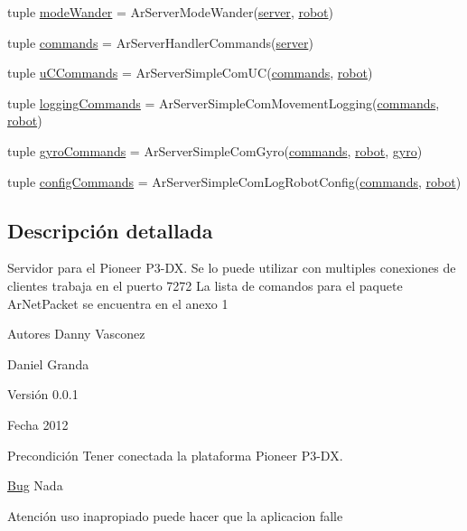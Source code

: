 \begin{DoxyCompactItemize}
tuple \hyperlink{namespaceservidor_ae22efed138dafc7284a3f71676a6757f}{modeWander} = ArServerModeWander(\hyperlink{namespaceservidor_adfced13b57fb69c12f8ab5a84d1a2356}{server}, \hyperlink{namespaceservidor_a20c40528942a814c3ba639d6fdf80c34}{robot})
\item 
tuple \hyperlink{namespaceservidor_a4bc8244e73099a1e67418ea064c30097}{commands} = ArServerHandlerCommands(\hyperlink{namespaceservidor_adfced13b57fb69c12f8ab5a84d1a2356}{server})
\item 
tuple \hyperlink{namespaceservidor_aa877c09d4a72ca2434441ff2dc406a29}{uCCommands} = ArServerSimpleComUC(\hyperlink{namespaceservidor_a4bc8244e73099a1e67418ea064c30097}{commands}, \hyperlink{namespaceservidor_a20c40528942a814c3ba639d6fdf80c34}{robot})
\item 
tuple \hyperlink{namespaceservidor_a8f73ad33af2f2a4f3bc9209b9390cfe8}{loggingCommands} = ArServerSimpleComMovementLogging(\hyperlink{namespaceservidor_a4bc8244e73099a1e67418ea064c30097}{commands}, \hyperlink{namespaceservidor_a20c40528942a814c3ba639d6fdf80c34}{robot})
\item 
tuple \hyperlink{namespaceservidor_a9bcfd4f54186b9c69cea8188548af8c8}{gyroCommands} = ArServerSimpleComGyro(\hyperlink{namespaceservidor_a4bc8244e73099a1e67418ea064c30097}{commands}, \hyperlink{namespaceservidor_a20c40528942a814c3ba639d6fdf80c34}{robot}, \hyperlink{namespaceservidor_a73a7e14af1c6774da1d3c5580e02573c}{gyro})
\item 
tuple \hyperlink{namespaceservidor_aa210848229916c300b66b7f7958baa24}{configCommands} = ArServerSimpleComLogRobotConfig(\hyperlink{namespaceservidor_a4bc8244e73099a1e67418ea064c30097}{commands}, \hyperlink{namespaceservidor_a20c40528942a814c3ba639d6fdf80c34}{robot})
\end{DoxyCompactItemize}


\subsection{Descripción detallada}
Servidor para el Pioneer P3-\/DX. Se lo puede utilizar con multiples conexiones de clientes trabaja en el puerto 7272 La lista de comandos para el paquete ArNetPacket se encuentra en el anexo 1 \begin{DoxyAuthor}{Autores}
Danny Vasconez 

Daniel Granda 
\end{DoxyAuthor}
\begin{DoxyVersion}{Versión}
0.0.1 
\end{DoxyVersion}
\begin{DoxyDate}{Fecha}
2012 
\end{DoxyDate}
\begin{DoxyPrecond}{Precondición}
Tener conectada la plataforma Pioneer P3-\/DX. 
\end{DoxyPrecond}
\begin{Desc}
\item[\hyperlink{bug__bug000002}{Bug}]Nada \end{Desc}
\begin{DoxyWarning}{Atención}
uso inapropiado puede hacer que la aplicacion falle 
\end{DoxyWarning}


